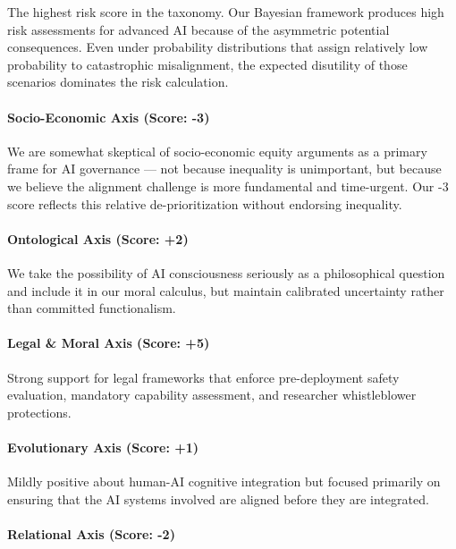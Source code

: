 The highest risk score in the taxonomy. Our Bayesian framework produces
high risk assessments for advanced AI because of the asymmetric
potential consequences. Even under probability distributions that assign
relatively low probability to catastrophic misalignment, the expected
disutility of those scenarios dominates the risk calculation.

\paragraph{Socio-Economic Axis (Score:
-3)}\label{socio-economic-axis-score--3}

We are somewhat skeptical of socio-economic equity arguments as a
primary frame for AI governance --- not because inequality is
unimportant, but because we believe the alignment challenge is more
fundamental and time-urgent. Our -3 score reflects this relative
de-prioritization without endorsing inequality.

\paragraph{Ontological Axis (Score: +2)}\label{ontological-axis-score-2}

We take the possibility of AI consciousness seriously as a philosophical
question and include it in our moral calculus, but maintain calibrated
uncertainty rather than committed functionalism.

\paragraph{Legal \& Moral Axis (Score:
+5)}\label{legal-moral-axis-score-5}

Strong support for legal frameworks that enforce pre-deployment safety
evaluation, mandatory capability assessment, and researcher
whistleblower protections.

\paragraph{Evolutionary Axis (Score:
+1)}\label{evolutionary-axis-score-1}

Mildly positive about human-AI cognitive integration but focused
primarily on ensuring that the AI systems involved are aligned before
they are integrated.

\paragraph{Relational Axis (Score: -2)}\label{relational-axis-score--2}

